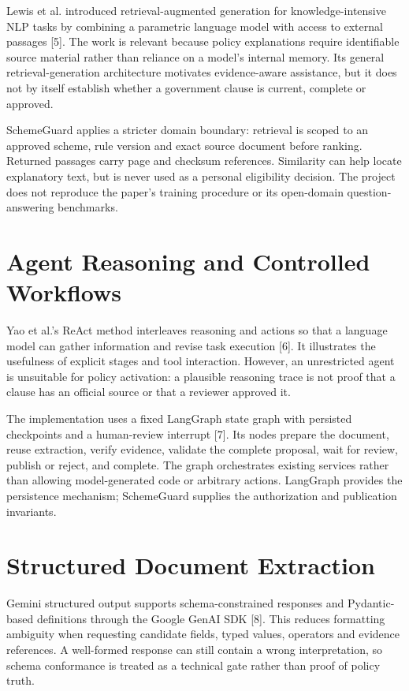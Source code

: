 \documentclass[12pt,a4paper,twoside]{report}
\begin{document}
Lewis et al. introduced retrieval-augmented generation for knowledge-intensive NLP tasks by combining a parametric language model with access to external passages [5]. The work is relevant because policy explanations require identifiable source material rather than reliance on a model's internal memory. Its general retrieval-generation architecture motivates evidence-aware assistance, but it does not by itself establish whether a government clause is current, complete or approved.

SchemeGuard applies a stricter domain boundary: retrieval is scoped to an approved scheme, rule version and exact source document before ranking. Returned passages carry page and checksum references. Similarity can help locate explanatory text, but is never used as a personal eligibility decision. The project does not reproduce the paper's training procedure or its open-domain question-answering benchmarks.

\section{Agent Reasoning and Controlled Workflows}

Yao et al.'s ReAct method interleaves reasoning and actions so that a language model can gather information and revise task execution [6]. It illustrates the usefulness of explicit stages and tool interaction. However, an unrestricted agent is unsuitable for policy activation: a plausible reasoning trace is not proof that a clause has an official source or that a reviewer approved it.

The implementation uses a fixed LangGraph state graph with persisted checkpoints and a human-review interrupt [7]. Its nodes prepare the document, reuse extraction, verify evidence, validate the complete proposal, wait for review, publish or reject, and complete. The graph orchestrates existing services rather than allowing model-generated code or arbitrary actions. LangGraph provides the persistence mechanism; SchemeGuard supplies the authorization and publication invariants.

\section{Structured Document Extraction}

Gemini structured output supports schema-constrained responses and Pydantic-based definitions through the Google GenAI SDK [8]. This reduces formatting ambiguity when requesting candidate fields, typed values, operators and evidence references. A well-formed response can still contain a wrong interpretation, so schema conformance is treated as a technical gate rather than proof of policy truth.
\end{document}
